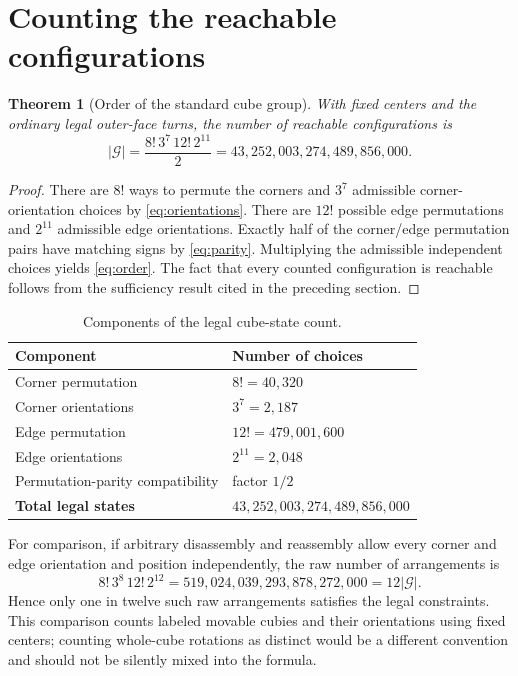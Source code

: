 \documentclass[11pt,a4paper]{article}
\newtheorem{theorem}{Theorem}[section]
\theoremstyle{definition}
\theoremstyle{remark}
\newcommand{\G}{\mathcal{G}}
\begin{document}
\section{Counting the reachable configurations}
\begin{theorem}[Order of the standard cube group]\label{thm:order}
With fixed centers and the ordinary legal outer-face turns, the number of reachable configurations is
\begin{equation}\label{eq:order}
\boxed{|\G|=\frac{8!\,3^7\,12!\,2^{11}}{2}
=43{,}252{,}003{,}274{,}489{,}856{,}000.}
\end{equation}
\end{theorem}
\begin{proof}
There are $8!$ ways to permute the corners and $3^7$ admissible corner-orientation choices by \cref{eq:orientations}. There are $12!$ possible edge permutations and $2^{11}$ admissible edge orientations. Exactly half of the corner/edge permutation pairs have matching signs by \cref{eq:parity}. Multiplying the admissible independent choices yields \cref{eq:order}. The fact that every counted configuration is reachable follows from the sufficiency result cited in the preceding section.
\end{proof}

\begin{table}[htbp]
\centering
\caption{Components of the legal cube-state count.}
\label{tab:count}
\begin{tabular}{@{}p{.43\linewidth}p{.37\linewidth}@{}}
\toprule
\textbf{Component} & \textbf{Number of choices} \\
\midrule
Corner permutation & $8!=40{,}320$ \\
Corner orientations & $3^7=2{,}187$ \\
Edge permutation & $12!=479{,}001{,}600$ \\
Edge orientations & $2^{11}=2{,}048$ \\
Permutation-parity compatibility & factor $1/2$ \\
\midrule
\textbf{Total legal states} & $43{,}252{,}003{,}274{,}489{,}856{,}000$ \\
\bottomrule
\end{tabular}
\end{table}

For comparison, if arbitrary disassembly and reassembly allow every corner and edge orientation and position independently, the raw number of arrangements is
\begin{equation}
8!\,3^8\,12!\,2^{12}=519{,}024{,}039{,}293{,}878{,}272{,}000
=12|\G|.
\end{equation}
Hence only one in twelve such raw arrangements satisfies the legal constraints. This comparison counts labeled movable cubies and their orientations using fixed centers; counting whole-cube rotations as distinct would be a different convention and should not be silently mixed into the formula.
\end{document}
